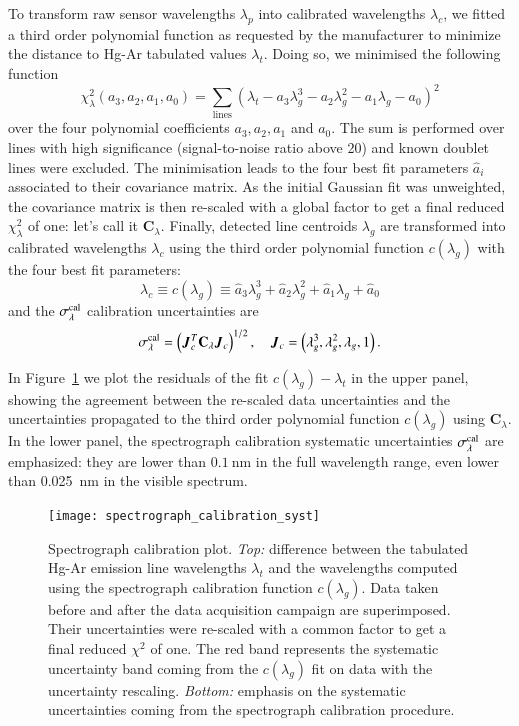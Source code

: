 To transform raw sensor wavelengths $\lambda_p$ into calibrated wavelengths $\lambda_c$, we fitted a third order polynomial function as requested by the manufacturer to minimize the distance to Hg-Ar tabulated values $\lambda_t$. Doing so, we minimised the following function 
\begin{equation}
    \chi_\lambda^2(a_3, a_2, a_1, a_0) = \sum_{\text{lines}} \left(\lambda_t-a_3 \lambda_g^3 - a_2 \lambda_g^2-a_1 \lambda_g -a_0\right)^2
\end{equation}
over the four polynomial coefficients $a_3, a_2, a_1$ and $a_0$. The sum is performed over lines with high significance (signal-to-noise ratio above 20) and known doublet lines were excluded. The minimisation leads to the four best fit parameters $\hat a_i$ associated to their covariance matrix. 
As the initial Gaussian fit was unweighted, the covariance matrix is then re-scaled with a global factor to get a final reduced $\chi_\lambda^2$ of one: let's call it $\mathbf{C}_\lambda$. 
Finally, detected line centroids $\lambda_g$ are transformed into calibrated wavelengths $\lambda_c$ using the third order polynomial function $c(\lambda_g)$ with the four best fit parameters:  
\begin{equation}
    \lambda_c \equiv c(\lambda_g) \equiv \hat a_3 \lambda_g^3 + \hat a_2 \lambda_g^2+\hat a_1 \lambda_g +\hat a_0
\end{equation}
and the $\sigma_\lambda^{\rm cal}$ calibration uncertainties are
\begin{equation}
    \sigma_\lambda^{\rm cal} = \left(\vec J_c^T \mathbf{C}_\lambda \vec J_c\right)^{1/2},\quad \vec J_c = \left(\lambda_g^3, \lambda_g^2, \lambda_g, 1\right).
\end{equation}

In Figure~\ref{fig:spectro_calib_syst} we plot the residuals of the fit $c(\lambda_g)-\lambda_t$ in the upper panel, showing the agreement between the re-scaled data uncertainties and the uncertainties propagated to the third order polynomial function $c(\lambda_g)$ using $\mathbf{C}_\lambda$. In the lower panel, the spectrograph calibration systematic uncertainties $\sigma_\lambda^{\rm cal}$ are emphasized: they are lower than $\SI{0.1}{\nm}$ in the full wavelength range, even lower than \SI{0.025}{\nm} in the visible spectrum.

\begin{figure}[!h]
\centering
\texttt{[image: spectrograph\_calibration\_syst]}
\caption{Spectrograph calibration plot. \textit{Top:} difference between the tabulated Hg-Ar emission line wavelengths $\lambda_t$ and the wavelengths computed using the spectrograph calibration function $c(\lambda_g)$. Data taken before and after the data acquisition campaign are superimposed. Their uncertainties were re-scaled with a common factor to get a final reduced $\chi^2$ of one. The red band represents the systematic uncertainty band coming from the $c(\lambda_g)$ fit on data with the uncertainty rescaling. \textit{Bottom:} emphasis on the systematic uncertainties coming from the spectrograph calibration procedure.}\label{fig:spectro_calib_syst}
\end{figure}

